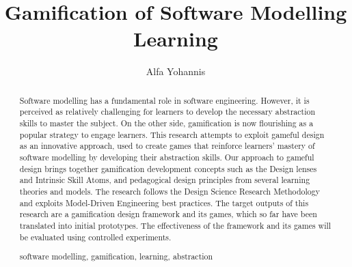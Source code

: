 \documentclass[runningheads,a4paper]{llncs}
\newcommand{\keywords}[1]{\par\addvspace\baselineskip
\noindent\keywordname\enspace\ignorespaces#1}
\begin{document}
\mainmatter %

\title{Gamification of Software Modelling Learning}


%
%
\author{Alfa Yohannis} %
%


%
%

\maketitle

\begin{abstract}
Software modelling has a fundamental role in software engineering. However, it is perceived as relatively challenging for learners to develop the necessary abstraction skills to master the subject. On the other side, gamification is now flourishing as a popular strategy to engage learners. This research attempts to exploit gameful design as an innovative approach, used to create games that reinforce learners' mastery of software modelling by developing their abstraction skills. Our approach to gameful design brings together gamification development concepts such as the Design lenses and Intrinsic Skill Atoms, and pedagogical design principles from several learning theories and models. The research follows the Design Science Research Methodology and exploits Model-Driven Engineering best practices. The target outputs of this research are a gamification design framework and its games, which so far have been translated into initial prototypes. The effectiveness of the framework and its games will be evaluated using controlled experiments.
\keywords{software modelling, gamification, learning, abstraction}
\end{abstract}
\end{document}
